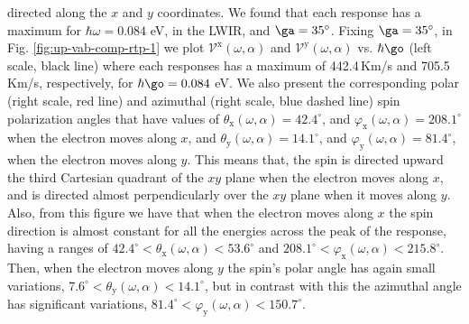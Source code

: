 \documentclass[prb,11pt,tightenlines,twocolumn,aps]{revtex4-1}
\begin{document}
directed along the $x$ and $y$ coordinates. We found that each response has a
maximum for $\hbar\omega=0.084$ eV, in the LWIR, and $\ga=35^{\circ}$.
% 
Fixing $\ga=35^{\circ}$, in Fig. \ref{fig:up-vab-comp-rtp-1} we plot
$\mathcal{V}^{\mathrm{x}} (\omega,\alpha)$ and
$\mathcal{V}^{\mathrm{y}}(\omega,\alpha)$ vs. $\hbar\go$ (left scale, black
line) where each responses has a maximum of 442.4\,Km/s and 705.5\,Km/s,
respectively, for $\hbar\go=0.084$ eV.
% 
We also present the corresponding polar (right scale, red line) and azimuthal
(right scale, blue dashed line) spin polarization angles that have values of
% 
$\theta_{\mathrm{x}}(\omega,\alpha) = 42.4^{\circ}$, and
$\varphi_{\mathrm{x}}(\omega,\alpha) = 208.1^{\circ}$ 
% 
when the  electron moves along $x$, and  
$\theta_{\mathrm{y}}(\omega,\alpha) = 14.1^{\circ}$, and
$\varphi_{\mathrm{y}} (\omega,\alpha) = 81.4^{\circ}$, 
% 
when the electron moves along $y$. This means that, the spin is directed upward
the third Cartesian quadrant of the $xy$ plane when the electron moves along
$x$, and is directed almost perpendicularly over the $xy$ plane when it moves
along $y$.
% 
Also, from this figure we have that when the electron moves along $x$ the spin
direction is almost constant for all the energies across the peak of the
response, having a ranges of
% 
$42.4^{\circ} < \theta_{\mathrm{x}}(\omega,\alpha) < 53.6^{\circ} $ 
and $208.1^{\circ} < \varphi_{\mathrm{x}} (\omega,\alpha) < 215.8^{\circ}$. 
% 
Then, when the electron moves along $y$ the spin's polar angle has again
small variations,
% 
$7.6^{\circ} < \theta_{\mathrm{y}} (\omega,\alpha) < 14.1^{\circ}$, 
% 
but in contrast with this the azimuthal angle has significant variations,
% 
$81.4^{\circ} < \varphi_{\mathrm{y}} (\omega,\alpha) < 150.7^{\circ}$.
\end{document}
